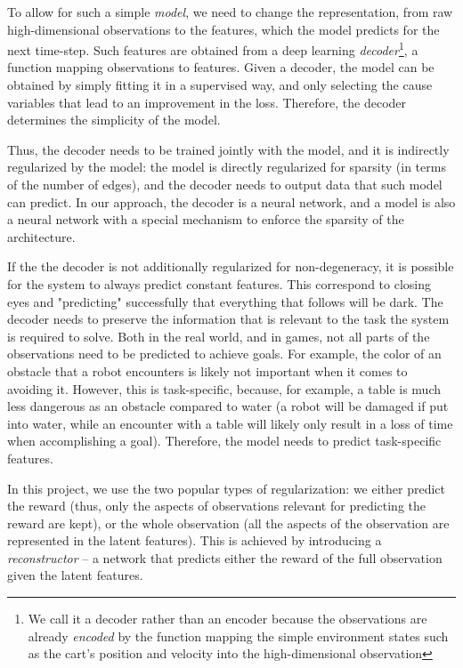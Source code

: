 \documentclass[a4paper,11pt,oneside]{report}
\begin{document}
To allow for such a simple {\em model}, we need to change the representation, from raw high-dimensional observations to the features, which the model predicts for the next time-step. Such features are obtained from a deep learning {\em decoder}\footnote{We call it a decoder rather than an encoder because the observations are already {\em encoded} by the function mapping the simple environment states such as the cart's position and velocity into the high-dimensional observation}, a function mapping observations to features. Given a decoder, the model can be obtained by simply fitting it in a supervised way, and only selecting the cause variables that lead to an improvement in the loss. Therefore, the decoder determines the simplicity of the model.

Thus, the decoder needs to be trained jointly with the model, and it is indirectly regularized by the model: the model is directly regularized for sparsity (in terms of the number of edges), and the decoder needs to output data that such model can predict.
In our approach, the decoder is a neural network, and a model is also a neural network with a special mechanism to enforce the sparsity of the architecture.

If the the decoder is not additionally regularized for non-degeneracy, it is possible for the system to always predict constant features. This correspond to closing eyes and "predicting" successfully that everything that follows will be dark. The decoder needs to preserve the information that is relevant to the task the system is required to solve. Both in the real world, and in games, not all parts of the observations need to be predicted to achieve goals. For example, the color of an obstacle that a robot encounters is likely not important when it comes to avoiding it. However, this is task-specific, because, for example, a table is much less dangerous as an obstacle compared to water (a robot will be damaged if put into water, while an encounter with a table will likely only result in a loss of time when accomplishing a goal). Therefore, the model needs to predict task-specific features.

In this project, we use the two popular types of regularization: we either predict the reward (thus, only the aspects of observations relevant for predicting the reward are kept), or the whole observation (all the aspects of the observation are represented in the latent features). This is achieved by introducing a {\em reconstructor} -- a network that predicts either the reward of the full observation given the latent features.
\end{document}
